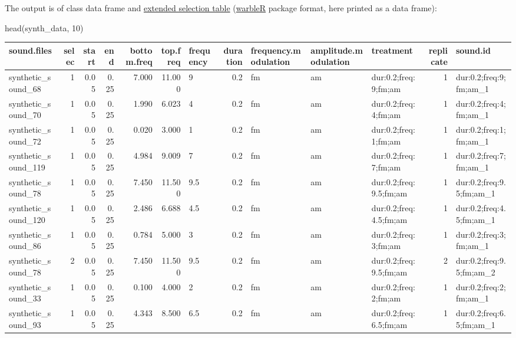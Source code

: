 \documentclass[
  letterpaper,
  DIV=11,
  numbers=noendperiod]{scrartcl}
\newenvironment{Shaded}{\begin{snugshade}}{\end{snugshade}}
\newcommand{\DecValTok}[1]{\textcolor[rgb]{0.25,0.63,0.44}{#1}}
\newcommand{\FunctionTok}[1]{\textcolor[rgb]{0.02,0.16,0.49}{#1}}
\newcommand{\NormalTok}[1]{\textcolor[rgb]{0.00,0.44,0.13}{#1}}
\begin{document}
The output is of class data frame and
\href{https://marce10.github.io/warbleR/reference/selection_table.html}{extended
selection table} (\href{https://marce10.github.io/warbleR}{warbleR}
package format, here printed as a data frame):

\begin{Shaded}
\begin{Highlighting}[numbers=left,,]
\FunctionTok{head}\NormalTok{(synth\_data, }\DecValTok{10}\NormalTok{)}
\end{Highlighting}
\end{Shaded}

\begin{landscape}
\begin{longtable*}[t]{lrrrrrlrlllrl}
\toprule
sound.files & selec & start & end & bottom.freq & top.freq & frequency & duration & frequency.modulation & amplitude.modulation & treatment & replicate & sound.id\\
\midrule
synthetic\_sound\_68 & 1 & 0.05 & 0.25 & 7.000 & 11.000 & 9 & 0.2 & fm & am & dur:0.2;freq:9;fm;am & 1 & dur:0.2;freq:9;fm;am\_1\\
synthetic\_sound\_70 & 1 & 0.05 & 0.25 & 1.990 & 6.023 & 4 & 0.2 & fm & am & dur:0.2;freq:4;fm;am & 1 & dur:0.2;freq:4;fm;am\_1\\
synthetic\_sound\_72 & 1 & 0.05 & 0.25 & 0.020 & 3.000 & 1 & 0.2 & fm & am & dur:0.2;freq:1;fm;am & 1 & dur:0.2;freq:1;fm;am\_1\\
synthetic\_sound\_119 & 1 & 0.05 & 0.25 & 4.984 & 9.009 & 7 & 0.2 & fm & am & dur:0.2;freq:7;fm;am & 1 & dur:0.2;freq:7;fm;am\_1\\
synthetic\_sound\_78 & 1 & 0.05 & 0.25 & 7.450 & 11.500 & 9.5 & 0.2 & fm & am & dur:0.2;freq:9.5;fm;am & 1 & dur:0.2;freq:9.5;fm;am\_1\\
\addlinespace
synthetic\_sound\_120 & 1 & 0.05 & 0.25 & 2.486 & 6.688 & 4.5 & 0.2 & fm & am & dur:0.2;freq:4.5;fm;am & 1 & dur:0.2;freq:4.5;fm;am\_1\\
synthetic\_sound\_86 & 1 & 0.05 & 0.25 & 0.784 & 5.000 & 3 & 0.2 & fm & am & dur:0.2;freq:3;fm;am & 1 & dur:0.2;freq:3;fm;am\_1\\
synthetic\_sound\_78 & 2 & 0.05 & 0.25 & 7.450 & 11.500 & 9.5 & 0.2 & fm & am & dur:0.2;freq:9.5;fm;am & 2 & dur:0.2;freq:9.5;fm;am\_2\\
synthetic\_sound\_33 & 1 & 0.05 & 0.25 & 0.100 & 4.000 & 2 & 0.2 & fm & am & dur:0.2;freq:2;fm;am & 1 & dur:0.2;freq:2;fm;am\_1\\
synthetic\_sound\_93 & 1 & 0.05 & 0.25 & 4.343 & 8.500 & 6.5 & 0.2 & fm & am & dur:0.2;freq:6.5;fm;am & 1 & dur:0.2;freq:6.5;fm;am\_1\\
\bottomrule
\end{longtable*}
\end{landscape}
\end{document}
